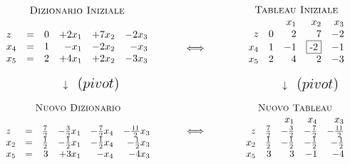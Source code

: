 \documentclass{article}
\begin{document}
  	\[
  	\begin{array}{c}
  	\mbox{\sc Dizionario Iniziale}\\ \\
  	\begin{array}{lcrrrr}
  	z    &=& 0 & +2x_1 & +7x_2 & -2x_3 \\  	
  	x_{4} &=& 1 & -x_1 & -2x_2 & -x_3 \\
  	x_{5} &=& 2 & +4x_1 & +2x_2 & -3x_3 \\
  	\end{array}\\ \\
  	\hspace{1cm} {\Huge \downarrow} {\Large \mbox{ \ $(pivot)$}}
  	\end{array}
  	\hfill
  	\hspace{1cm}
  	{\Huge \Longleftrightarrow}
  	\hfill
  	\hspace{1.2cm}
  	\begin{array}{c}
  	\mbox{\sc Tableau Iniziale}\\ 
  	\begin{array}{rrrrr}
  	   &  & x_1  & x_2 & x_3  \\
  	z  & 0 & 2 &  7   &  -2 \\  	
  	x_4 &  1 & -1  &  \fbox{-2}   &  -1 \\
  	x_5 & 2 & 4 & 2 &  -3 \\
  	\end{array}\\ \\
  	\hspace{1cm} {\Huge \downarrow} {\Large \mbox{ \ $(pivot)$}}
  	\end{array}
  	\]
  	
  	\[
  	\begin{array}{c}
  	\mbox{\sc Nuovo Dizionario}\\ \\
			\begin{array}{lcrrrr}
			z    &=& \frac{7}{2} & -\frac{3}{2}x_1 & -\frac{7}{2}x_4 & -\frac{11}{2}x_3 \\			
			x_{2} &=& \frac{1}{2} & -\frac{1}{2}x_1 & -\frac{1}{2}x_4 & -\frac{1}{2}x_3 \\
			x_{5} &=& 3 & +3x_1 & -x_4 & -4x_3 \\
			\end{array}		
  	\end{array}
  	\hfill
  	\hspace{1cm}
  	{\Huge \Longleftrightarrow}
  	\hfill
  	\hspace{1.2cm}
  	\begin{array}{c}
  	\mbox{\sc Nuovo Tableau}\\ 
  	\begin{array}{rrrrr}
  	& & x_1  & x_4 & x_3  \\
  	z  &  \frac{7}{2} &  -\frac{3}{2} & -\frac{7}{2}  & -\frac{11}{2} \\  	
  	x_2 &  \frac{1}{2} &  -\frac{1}{2} & -\frac{1}{2}   &  -\frac{1}{2} \\
  	x_5 & 3 &  3  &  -1  &  -4 \\
  	\end{array}
  	\end{array}
  	\]
  	
\end{document}

